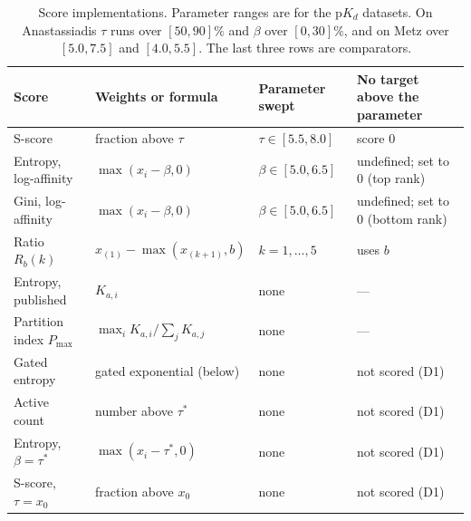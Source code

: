 \documentclass{article}
\begin{document}
\setcounter{table}{1}
\begin{table}[h]
  \centering
  \caption{Score implementations. Parameter ranges are for the
           $\mathrm{p}K_d$ datasets. On Anastassiadis $\tau$ runs over
           $[50, 90]\%$ and $\beta$ over $[0, 30]\%$, and on Metz over
           $[5.0, 7.5]$ and $[4.0, 5.5]$. The last three rows are comparators.}
  \label{tab:implementations}
  \footnotesize
  \setlength{\tabcolsep}{3pt}
  \begin{tabular}{p{}p{}p{}p{}}
    \toprule
    Score & Weights or formula & Parameter swept & No target above the parameter \\
    \midrule
    S-score                    & fraction above $\tau$                  & $\tau \in [5.5, 8.0]$ & score $0$ \\
    Entropy, log-affinity      & $\max(x_i - \beta, 0)$                 & $\beta \in [5.0, 6.5]$ & undefined; set to $0$ (top rank) \\
    Gini, log-affinity         & $\max(x_i - \beta, 0)$                 & $\beta \in [5.0, 6.5]$ & undefined; set to $0$ (bottom rank) \\
    Ratio $R_b(k)$             & $x_{(1)} - \max(x_{(k+1)}, b)$         & $k = 1, \ldots, 5$     & uses $b$ \\
    Entropy, published         & $K_{a,i}$                              & none                   & --- \\
    Partition index $P_{\max}$ & $\max_i K_{a,i} / \sum_j K_{a,j}$      & none                   & --- \\
    Gated entropy              & gated exponential (below) & none  & not scored (D1) \\
    Active count               & number above $\tau^*$                  & none                   & not scored (D1) \\
    Entropy, $\beta = \tau^*$  & $\max(x_i - \tau^*, 0)$                & none                   & not scored (D1) \\
    S-score, $\tau = x_0$      & fraction above $x_0$                   & none                   & not scored (D1) \\
    \bottomrule
  \end{tabular}
\end{table}
\end{document}

